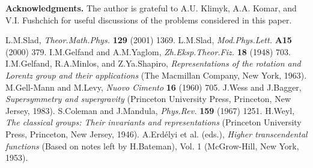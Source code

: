 \documentclass[a4paper,12pt]{article}
\begin{document}
{\bf Acknowledgments.} The author is grateful to A.U. Klimyk, A.A. Komar, and
V.I. Fushchich for useful discussions of the problems considered in this paper.

\begin{thebibliography}{99}

   L.M.Slad, {\it Theor.Math.Phys.} {\bf 129} (2001) 1369. 
   L.M.Slad, {\it Mod.Phys.Lett.} {\bf A15} (2000) 379.
   I.M.Gelfand and A.M.Yaglom, {\it Zh.Eksp.Theor.Fiz.} {\bf 18} (1948) 703. 
   I.M.Gelfand, R.A.Minlos, and Z.Ya.Shapiro, {\it Representations of the
   rotation and Lorentz group and their applications} (The Macmillan Company, 
   New York, 1963).
   M.Gell-Mann and M.Levy, {\it Nuovo Cimento} {\bf 16} (1960) 705.
   J.Wess and J.Bagger, {\it Supersymmetry and supergravity} (Princeton
   University Press, Princeton, New Jersey, 1983).
   S.Coleman and J.Mandula, {\it Phys.Rev.} {\bf 159} (1967) 1251.
   H.Weyl, {\it The classical groups: Their invariants and representations} 
   (Princeton University Press, Princeton, New Jersey, 1946).
   A.Erd\'elyi et al. (eds.), {\it Higher transcendental functions} (Based on
   notes left by H.Bateman), Vol. 1 (McGrow-Hill, New York, 1953).
   
\end{thebibliography}
\end{document}
